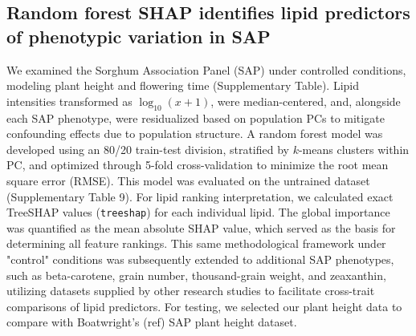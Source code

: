 \documentclass[10pt,letterpaper]{article}
\begin{document}
\begin{itemize}





\subsection*{Random forest SHAP identifies lipid predictors of phenotypic variation in SAP}
We examined the Sorghum Association Panel (SAP) under controlled conditions, modeling plant height and flowering time (Supplementary Table). Lipid intensities transformed as $\log_{10}(x+1)$, were median-centered, and, alongside each SAP phenotype, were residualized based on population PCs to mitigate confounding effects due to population structure. A random forest model was developed using an 80/20 train-test division, stratified by $k$-means clusters within PC, and optimized through 5-fold cross-validation to minimize the root mean square error (RMSE). This model was evaluated on the untrained dataset (Supplementary Table 9). For lipid ranking interpretation, we calculated exact TreeSHAP values (\texttt{treeshap}) for each individual lipid. The global importance was quantified as the mean absolute SHAP value, which served as the basis for determining all feature rankings. This same methodological framework under "control" conditions was subsequently extended to additional SAP phenotypes, such as  beta-carotene, grain number, thousand-grain weight, and zeaxanthin, utilizing datasets supplied by other research studies to facilitate cross-trait comparisons of lipid predictors. For testing, we selected our plant height data to compare with Boatwright's (ref) SAP plant height dataset. 


\end{itemize}
\end{document}
